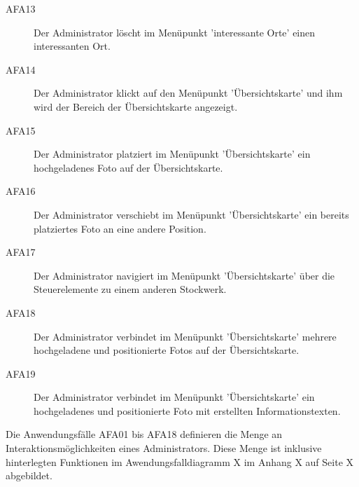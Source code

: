 \begin{description}
  \item[AFA13] Der Administrator löscht im Menüpunkt 'interessante Orte' einen interessanten Ort.
  \item[AFA14] Der Administrator klickt auf den Menüpunkt 'Übersichtskarte' und ihm wird der Bereich der Übersichtskarte angezeigt.
  \item[AFA15] Der Administrator platziert im Menüpunkt 'Übersichtskarte' ein hochgeladenes Foto auf der Übersichtskarte.
  \item[AFA16] Der Administrator verschiebt im Menüpunkt 'Übersichtskarte' ein bereits platziertes Foto an eine andere Position.
  \item[AFA17] Der Administrator navigiert im Menüpunkt 'Übersichtskarte' über die Steuerelemente zu einem anderen Stockwerk.
  \item[AFA18] Der Administrator verbindet im Menüpunkt 'Übersichtskarte' mehrere hochgeladene und positionierte Fotos auf der Übersichtskarte.
  \item[AFA19] Der Administrator verbindet im Menüpunkt 'Übersichtskarte' ein hochgeladenes und positionierte Foto mit erstellten Informationstexten.
\end{description}

Die Anwendungsfälle AFA01 bis AFA18 definieren die Menge an Interaktionsmöglichkeiten eines Administrators. Diese Menge ist inklusive hinterlegten Funktionen im Awendungsfalldiagramm X im Anhang X auf Seite X abgebildet.
